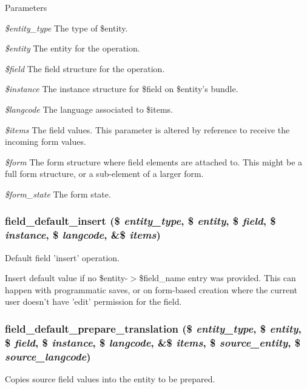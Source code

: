 \begin{DoxyParams}{Parameters}
\item[{\em \$entity\_\-type}]The type of \$entity. \item[{\em \$entity}]The entity for the operation. \item[{\em \$field}]The field structure for the operation. \item[{\em \$instance}]The instance structure for \$field on \$entity's bundle. \item[{\em \$langcode}]The language associated to \$items. \item[{\em \$items}]The field values. This parameter is altered by reference to receive the incoming form values. \item[{\em \$form}]The form structure where field elements are attached to. This might be a full form structure, or a sub-\/element of a larger form. \item[{\em \$form\_\-state}]The form state. \end{DoxyParams}
\hypertarget{field_8default_8inc_a2948e1001ff0b624c8c367589b1c8eaa}{
\subsubsection[{field\_\-default\_\-insert}]{\setlength{\rightskip}{0pt plus 5cm}field\_\-default\_\-insert (\$ {\em entity\_\-type}, \/  \$ {\em entity}, \/  \$ {\em field}, \/  \$ {\em instance}, \/  \$ {\em langcode}, \/  \&\$ {\em items})}}
\label{field_8default_8inc_a2948e1001ff0b624c8c367589b1c8eaa}
Default field 'insert' operation.

Insert default value if no \$entity-\/$>$\$field\_\-name entry was provided. This can happen with programmatic saves, or on form-\/based creation where the current user doesn't have 'edit' permission for the field. \hypertarget{field_8default_8inc_ad6fb9a8915e3da542894cf88483849ca}{
\subsubsection[{field\_\-default\_\-prepare\_\-translation}]{\setlength{\rightskip}{0pt plus 5cm}field\_\-default\_\-prepare\_\-translation (\$ {\em entity\_\-type}, \/  \$ {\em entity}, \/  \$ {\em field}, \/  \$ {\em instance}, \/  \$ {\em langcode}, \/  \&\$ {\em items}, \/  \$ {\em source\_\-entity}, \/  \$ {\em source\_\-langcode})}}
\label{field_8default_8inc_ad6fb9a8915e3da542894cf88483849ca}
Copies source field values into the entity to be prepared.


